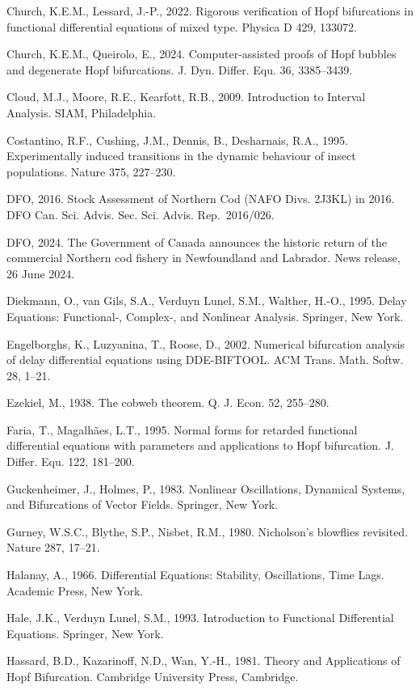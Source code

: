 \documentclass[11pt]{article}
\begin{document}
Church, K.E.M., Lessard, J.-P., 2022. Rigorous verification of Hopf
bifurcations in functional differential equations of mixed type. Physica
D 429, 133072.

Church, K.E.M., Queirolo, E., 2024. Computer-assisted proofs of Hopf
bubbles and degenerate Hopf bifurcations. J. Dyn. Differ. Equ. 36,
3385--3439.

Cloud, M.J., Moore, R.E., Kearfott, R.B., 2009. Introduction to Interval
Analysis. SIAM, Philadelphia.

Costantino, R.F., Cushing, J.M., Dennis, B., Desharnais, R.A., 1995.
Experimentally induced transitions in the dynamic behaviour of insect
populations. Nature 375, 227--230.

DFO, 2016. Stock Assessment of Northern Cod (NAFO Divs. 2J3KL) in 2016.
DFO Can. Sci. Advis. Sec. Sci. Advis. Rep.~2016/026.

DFO, 2024. The Government of Canada announces the historic return of the
commercial Northern cod fishery in Newfoundland and Labrador. News
release, 26 June 2024.

Diekmann, O., van Gils, S.A., Verduyn Lunel, S.M., Walther, H.-O., 1995.
Delay Equations: Functional-, Complex-, and Nonlinear Analysis.
Springer, New York.

Engelborghs, K., Luzyanina, T., Roose, D., 2002. Numerical bifurcation
analysis of delay differential equations using DDE-BIFTOOL. ACM Trans.
Math. Softw. 28, 1--21.

Ezekiel, M., 1938. The cobweb theorem. Q. J. Econ. 52, 255--280.

Faria, T., Magalh\~aes, L.T., 1995. Normal forms for retarded functional
differential equations with parameters and applications to Hopf
bifurcation. J. Differ. Equ. 122, 181--200.

Guckenheimer, J., Holmes, P., 1983. Nonlinear Oscillations, Dynamical
Systems, and Bifurcations of Vector Fields. Springer, New York.

Gurney, W.S.C., Blythe, S.P., Nisbet, R.M., 1980. Nicholson's blowflies
revisited. Nature 287, 17--21.

Halanay, A., 1966. Differential Equations: Stability, Oscillations, Time
Lags. Academic Press, New York.

Hale, J.K., Verduyn Lunel, S.M., 1993. Introduction to Functional
Differential Equations. Springer, New York.

Hassard, B.D., Kazarinoff, N.D., Wan, Y.-H., 1981. Theory and
Applications of Hopf Bifurcation. Cambridge University Press, Cambridge.
\end{document}
